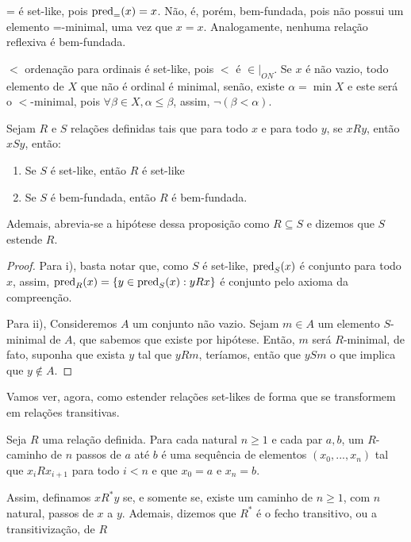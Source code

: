 \begin{example}
    = é set-like, pois $\operatorname{pred}_=(x) = {x}$. Não, é, porém, bem-fundada, pois não possui um elemento =-minimal, uma vez que $x = x$. Analogamente, nenhuma relação reflexiva é bem-fundada.
\end{example}
\begin{example}
    $<$ ordenação para ordinais é set-like, pois $<$ é $\in|_{ON}$. Se $x$ é não vazio, todo elemento de $X$ que não é ordinal é minimal, senão, existe $\alpha = \min X$ e este será o $<$-minimal, pois $\forall \beta \in X, \alpha \leq \beta$, assim, $\neg(\beta < \alpha)$.
\end{example}


\begin{proposition}
    Sejam $R$ e $S$ relações definidas tais que para todo $x$ e para todo $y$, se $xRy$, então $xSy$, então:
    \begin{enumerate}[label=\roman*)]
        \item Se $S$ é set-like, então $R$ é set-like
        \item Se $S$ é bem-fundada, então $R$ é bem-fundada.
    \end{enumerate}
    Ademais, abrevia-se a hipótese dessa proposição como $R \subseteq S$ e dizemos que $S$ estende $R$.
\end{proposition}
\begin{proof}
     Para i), basta notar que, como $S$ é set-like, $\operatorname{pred}_S(x)$ é conjunto para todo $x$, assim, $\operatorname{pred}_R(x) = \left\{ y \in \operatorname{pred}_S(x): yRx \right\}$ é conjunto pelo axioma da compreenção.

     Para ii), Consideremos $A$ um conjunto não vazio. Sejam $m\in A$ um elemento $S$-minimal de $A$, que sabemos que existe por hipótese. Então, $m$ será $R$-minimal, de fato, suponha que exista $y$ tal que $yRm$, teríamos, então que $ySm$ o que implica que $y\notin A$.
\end{proof}

Vamos ver, agora, como estender relações set-likes de forma que se transformem em relações transitivas.

\begin{definition}
    Seja $R$ uma relação definida. Para cada natural $n \geq 1$ e cada par $a,b$, um $R$-caminho de $n$ passos de $a$ até $b$ é uma sequência de elementos $(x_0,...,x_n)$ tal que $x_i R x_{i+1}$ para todo $i < n$ e que $x_0 = a$ e $x_n = b$.

    Assim, definamos $x R^*y$ se, e somente se, existe um caminho de $n \geq 1$, com $n$ natural, passos de $x$ a $y$. Ademais, dizemos que $R^*$ é o fecho transitivo, ou a transitivização, de $R$
    
\end{definition}

